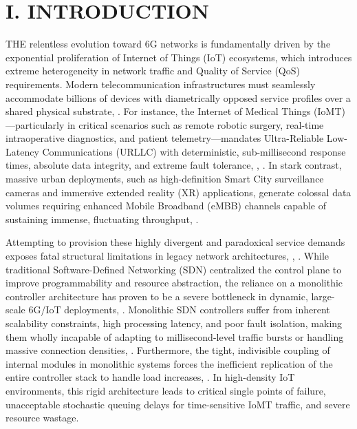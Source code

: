 \section{I. INTRODUCTION}\label{i.-introduction}

\textsc{T}\textsc{HE} relentless evolution toward 6G networks is fundamentally driven by the exponential proliferation of Internet of Things (IoT) ecosystems, which introduces extreme heterogeneity in network traffic and Quality of Service (QoS) requirements\cite{b1}. Modern telecommunication infrastructures must seamlessly accommodate billions of devices with diametrically opposed service profiles over a shared physical substrate\cite{b2}, \cite{b3}. For instance, the Internet of Medical Things (IoMT)---particularly in critical scenarios such as remote robotic surgery, real-time intraoperative diagnostics, and patient telemetry---mandates Ultra-Reliable Low-Latency Communications (URLLC) with deterministic, sub-millisecond response times, absolute data integrity, and extreme fault tolerance\cite{b1}, \cite{b4}, \cite{b5}. In stark contrast, massive urban deployments, such as high-definition Smart City surveillance cameras and immersive extended reality (XR) applications, generate colossal data volumes requiring enhanced Mobile Broadband (eMBB) channels capable of sustaining immense, fluctuating throughput\cite{b4}, \cite{b6}.

Attempting to provision these highly divergent and paradoxical service demands exposes fatal structural limitations in legacy network architectures\cite{b1}, \cite{b7}, \cite{b8}. While traditional Software-Defined Networking (SDN) centralized the control plane to improve programmability and resource abstraction, the reliance on a monolithic controller architecture has proven to be a severe bottleneck in dynamic, large-scale 6G/IoT deployments\cite{b8}, \cite{b9}. Monolithic SDN controllers suffer from inherent scalability constraints, high processing latency, and poor fault isolation, making them wholly incapable of adapting to millisecond-level traffic bursts or handling massive connection densities\cite{b8}, \cite{b9}. Furthermore, the tight, indivisible coupling of internal modules in monolithic systems forces the inefficient replication of the entire controller stack to handle load increases\cite{b8}, \cite{b9}. In high-density IoT environments, this rigid architecture leads to critical single points of failure, unacceptable stochastic queuing delays for time-sensitive IoMT traffic, and severe resource wastage\cite{b9}.

